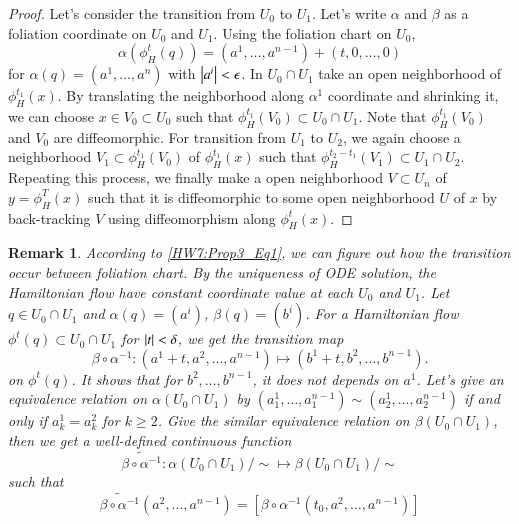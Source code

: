 \documentclass[a4paper, 12pt]{article}
\theoremstyle{Mydefinition}
\newtheorem{remark}[statement]{Remark}
\theoremstyle{Mytheorem}
\begin{document}
\begin{enumerate}
\begin{proof}
    Let's consider the transition from $U_0$ to $U_1$. Let's write $\alpha$ and $\beta$ as a foliation coordinate on $U_0$ and $U_1$. Using the foliation chart on $U_0$, 
    \begin{equation}\label{HW7:Prop3_Eq1}
        \alpha(\phi^t_H(q)) = (a^1, \ldots, a^{n-1}) + (t,0,\ldots, 0)
    \end{equation}
    for $\alpha(q) = (a^1, \ldots, a^n)$ with $\abs{a^i}<\epsilon$. In $U_0\cap U_1$ take an open neighborhood of $\phi^{t_1}_H(x)$. By translating the neighborhood along $\alpha^1$ coordinate and shrinking it, we can choose $x\in V_0\subset U_0$ such that $\phi^{t_1}_H(V_0)\subset U_0\cap U_1$. Note that $\phi^{t_1}_H(V_0)$ and $V_0$ are diffeomorphic. For transition from $U_1$ to $U_2$, we again choose a neighborhood $V_1\subset \phi^{t_1}_H(V_0)$ of $\phi^{t_1}_H(x)$ such that $\phi^{t_2-t_1}_H(V_1)\subset U_1\cap U_2$. Repeating this process, we finally make a open neighborhood $V\subset U_n$ of $y= \phi^T_H(x)$ such that it is diffeomorphic to some open neighborhood $U$ of $x$ by back-tracking $V$ using diffeomorphism along $\phi^t_H(x)$.
    \end{proof}
    \begin{remark}\label{HW7:Remark1}
    According to \eqref{HW7:Prop3_Eq1}, we can figure out how the transition occur between foliation chart. By the uniqueness of ODE solution, the Hamiltonian flow have constant coordinate value at each $U_0$ and $U_1$. Let $q\in U_0\cap U_1$ and $\alpha(q) = (a^i)$, $\beta(q) = (b^i)$. For a Hamiltonian flow $\phi^t(q)\subset U_0\cap U_1$ for $\abs{t}<\delta$, we get the transition map
    \begin{equation*}
        \beta\circ \alpha^{-1}:(a^1+t, a^2, \ldots, a^{n-1})\mapsto (b^1+t, b^2, \ldots, b^{n-1}).
    \end{equation*}
    on $\phi^t(q)$. It shows that for $b^2, \ldots, b^{n-1}$, it does not depends on $a^1$. Let's give an equivalence relation on $\alpha(U_0\cap U_1)$ by $(a_1^1, \ldots, a^{n-1}_1)\sim (a_2^1, \ldots, a^{n-1}_2)$ if and only if $a_k^1=a_k^2$ for $k\geq 2$. Give the similar equivalence relation on $\beta(U_0\cap U_1)$, then we get a well-defined continuous function
    \begin{equation*}
        \widetilde{\beta\circ \alpha^{-1}}:\alpha(U_0\cap U_1)/\sim \mapsto \beta(U_0\cap U_1)/\sim
    \end{equation*}
    such that
    \begin{equation*}
        \widetilde{\beta\circ \alpha^{-1}}(a^2, \ldots, a^{n-1}) = [\beta\circ \alpha^{-1}(t_0, a^2, \ldots, a^{n-1})]

\end{equation*}
\end{remark}
\end{enumerate}
\end{document}
